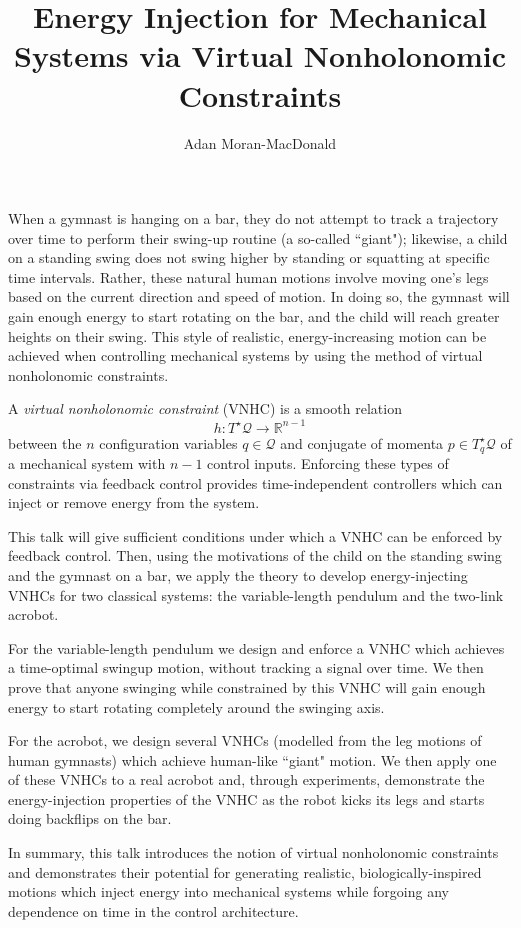 \documentclass[12pt]{article}
\begin{document}
\title{Energy Injection for Mechanical Systems via Virtual Nonholonomic Constraints}
\author{Adan Moran-MacDonald}
\maketitle

When a gymnast is hanging on a bar, they do not attempt to track a trajectory
over time to perform their swing-up routine (a so-called ``giant");
likewise, a child on a standing swing does not swing higher by standing or
squatting at specific time intervals. 
Rather, these natural human motions involve moving one's legs based on the
current direction and speed of motion. 
In doing so, the gymnast will gain enough energy to start rotating on the bar,
and the child will reach greater heights on their swing. 
This style of realistic, energy-increasing motion can be achieved when
controlling mechanical systems by using the method of virtual nonholonomic
constraints.

A \textit{virtual nonholonomic constraint} (VNHC) is a smooth relation 
\[
    h : T^\star \mathcal{Q} \rightarrow \mathbb{R}^{n-1}
\]
between the \(n\) configuration variables \(q \in \mathcal{Q}\) and conjugate of
momenta \(p \in T_q^\star\mathcal{Q}\) of a mechanical system with 
\(n-1\) control inputs.
Enforcing these types of constraints via feedback control provides
time-independent controllers which can inject or remove energy from the system.

This talk will give sufficient conditions under which a VNHC can be enforced by
feedback control.
Then, using the motivations of the child on the standing swing and the gymnast
on a bar, we apply the theory to develop energy-injecting VNHCs for two
classical systems: the variable-length pendulum and the two-link acrobot. 

For the variable-length pendulum we design and enforce a VNHC which achieves a
time-optimal swingup motion, without tracking a signal over time. 
We then prove that anyone swinging while constrained by this VNHC will gain
enough energy to start rotating completely around the swinging axis.

For the acrobot, we design several VNHCs (modelled from the leg motions of human
gymnasts) which achieve human-like ``giant" motion.
We then apply one of these VNHCs to a real acrobot and, through experiments,
demonstrate the energy-injection properties of the VNHC as the robot kicks its
legs and starts doing backflips on the bar. 

In summary, this talk introduces the notion of virtual nonholonomic constraints
and demonstrates their potential for generating realistic, biologically-inspired
motions which inject energy into mechanical systems while forgoing any
dependence on time in the control architecture.

\end{document}
